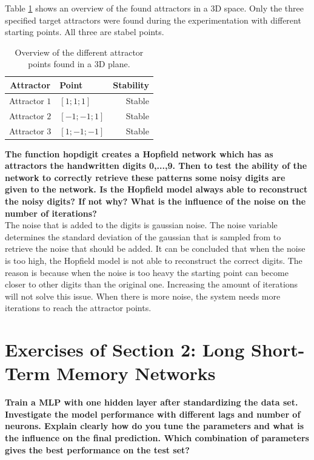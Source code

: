 \documentclass[a4paper,10pt]{article}
\begin{document}
Table \ref{tab:att3} shows an overview of the found attractors in a 3D space. Only the three specified target attractors were found during the experimentation with different starting points. All three are stabel points. 
\begin{table}
	\centering
	\begin{tabular}{@{}clr@{}} \toprule
		\textbf{Attractor} & \textbf{Point} & \textbf{Stability}\\\midrule
		Attractor $ 1 $ & $ [1;1;1] $ & Stable\\
		Attractor $ 2 $ & $ [-1;-1;1] $ & Stable\\
		Attractor $ 3 $ & $ [1;-1;-1] $ & Stable\\\bottomrule
	\end{tabular}
	\caption{Overview of the different attractor points found in a 3D plane.}
	\label{tab:att3}
\end{table}
\newpage
\textbf{The function hopdigit creates a Hopfield network which has as attractors the handwritten digits 0,...,9. Then to test
	the ability of the network to correctly retrieve these patterns some noisy digits are given to the network. Is the Hopfield
	model always able to reconstruct the noisy digits? If not why? What is the influence of the noise on the number of
	iterations?}\\

The noise that is added to the digits is gaussian noise. The noise variable determines the standard deviation of the gaussian that is sampled from to retrieve the noise that should be added. It can be concluded that when the noise is too high, the Hopfield model is not able to reconstruct the correct digits. The reason is because when the noise is too heavy the starting point can become closer to other digits than the original one. Increasing the amount of iterations will not solve this issue. When there is more noise, the system needs more iterations to reach the attractor points.

\section{Exercises of Section 2: Long Short-Term Memory Networks}
\textbf{Train a MLP with one hidden layer after standardizing the data set. Investigate the model
performance with different lags and number of neurons. Explain clearly how do you tune the parameters and what is the influence
on the final prediction. Which combination of parameters gives the best performance on the test set?}\\



















%
\end{document}

